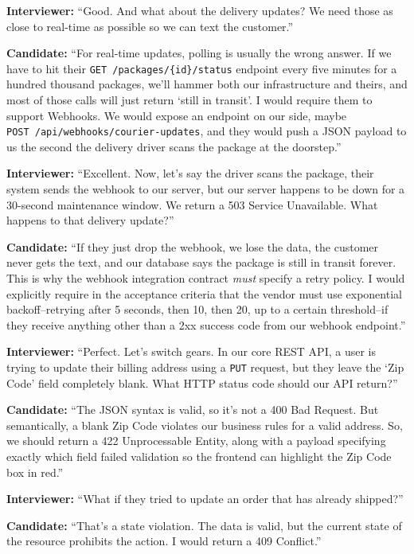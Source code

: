 \documentclass[
  11pt,
  openany,
  oneside]{book}
\begin{document}
\textbf{Interviewer:} ``Good. And what about the delivery updates? We
need those as close to real-time as possible so we can text the
customer.''

\textbf{Candidate:} ``For real-time updates, polling is usually the
wrong answer. If we have to hit their
\texttt{GET\ /packages/\{id\}/status} endpoint every five minutes for a
hundred thousand packages, we'll hammer both our infrastructure and
theirs, and most of those calls will just return `still in transit'. I
would require them to support Webhooks. We would expose an endpoint on
our side, maybe \texttt{POST\ /api/webhooks/courier-updates}, and they
would push a JSON payload to us the second the delivery driver scans the
package at the doorstep.''

\textbf{Interviewer:} ``Excellent. Now, let's say the driver scans the
package, their system sends the webhook to our server, but our server
happens to be down for a 30-second maintenance window. We return a 503
Service Unavailable. What happens to that delivery update?''

\textbf{Candidate:} ``If they just drop the webhook, we lose the data,
the customer never gets the text, and our database says the package is
still in transit forever. This is why the webhook integration contract
\emph{must} specify a retry policy. I would explicitly require in the
acceptance criteria that the vendor must use exponential
backoff--retrying after 5 seconds, then 10, then 20, up to a certain
threshold--if they receive anything other than a 2xx success code from
our webhook endpoint.''

\textbf{Interviewer:} ``Perfect. Let's switch gears. In our core REST
API, a user is trying to update their billing address using a
\texttt{PUT} request, but they leave the `Zip Code' field completely
blank. What HTTP status code should our API return?''

\textbf{Candidate:} ``The JSON syntax is valid, so it's not a 400 Bad
Request. But semantically, a blank Zip Code violates our business rules
for a valid address. So, we should return a 422 Unprocessable Entity,
along with a payload specifying exactly which field failed validation so
the frontend can highlight the Zip Code box in red.''

\textbf{Interviewer:} ``What if they tried to update an order that has
already shipped?''

\textbf{Candidate:} ``That's a state violation. The data is valid, but
the current state of the resource prohibits the action. I would return a
409 Conflict.''
\end{document}
